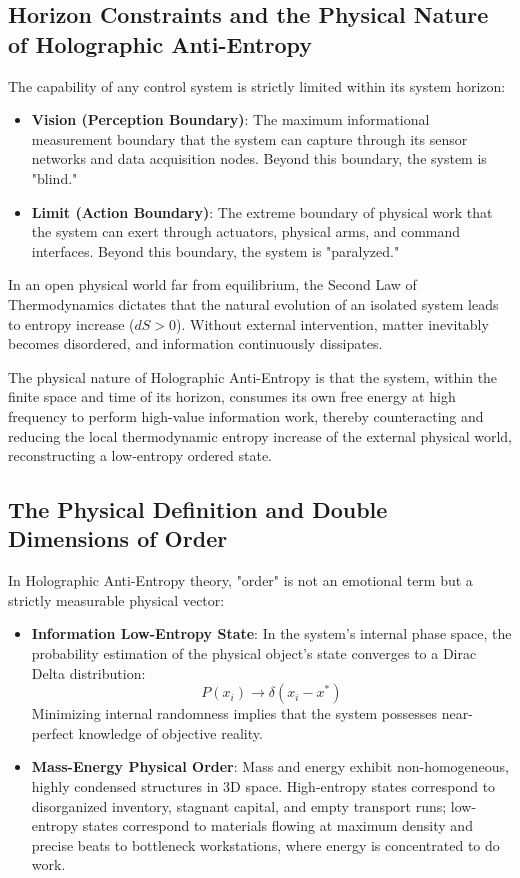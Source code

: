 \documentclass{article}
\begin{document}
\subsection{Horizon Constraints and the Physical Nature of Holographic Anti-Entropy}
The capability of any control system is strictly limited within its system horizon:
\begin{itemize}
    \item \textbf{Vision (Perception Boundary)}: The maximum informational measurement boundary that the system can capture through its sensor networks and data acquisition nodes. Beyond this boundary, the system is "blind."
    \item \textbf{Limit (Action Boundary)}: The extreme boundary of physical work that the system can exert through actuators, physical arms, and command interfaces. Beyond this boundary, the system is "paralyzed."
\end{itemize}

In an open physical world far from equilibrium, the Second Law of Thermodynamics dictates that the natural evolution of an isolated system leads to entropy increase ($dS > 0$). Without external intervention, matter inevitably becomes disordered, and information continuously dissipates.

The physical nature of Holographic Anti-Entropy is that the system, within the finite space and time of its horizon, consumes its own free energy at high frequency to perform high-value information work, thereby counteracting and reducing the local thermodynamic entropy increase of the external physical world, reconstructing a low-entropy ordered state.

\subsection{The Physical Definition and Double Dimensions of Order}
In Holographic Anti-Entropy theory, "order" is not an emotional term but a strictly measurable physical vector:
\begin{itemize}
    \item \textbf{Information Low-Entropy State}: In the system's internal phase space, the probability estimation of the physical object's state converges to a Dirac Delta distribution:
    \begin{equation}
        P(x_i) \longrightarrow \delta(x_i - x^*)
    \end{equation}
    Minimizing internal randomness implies that the system possesses near-perfect knowledge of objective reality.
    \item \textbf{Mass-Energy Physical Order}: Mass and energy exhibit non-homogeneous, highly condensed structures in 3D space. High-entropy states correspond to disorganized inventory, stagnant capital, and empty transport runs; low-entropy states correspond to materials flowing at maximum density and precise beats to bottleneck workstations, where energy is concentrated to do work.
\end{itemize}
\end{document}
